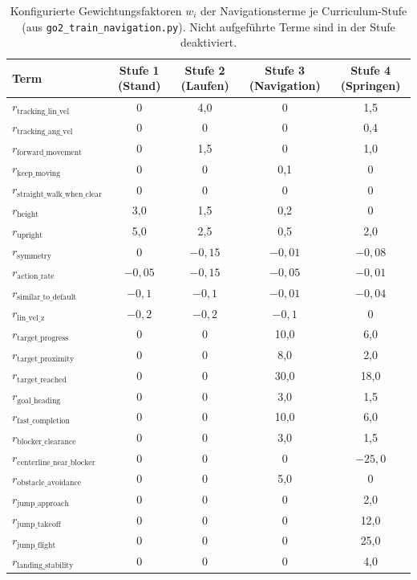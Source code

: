 \begin{table}[htbp]
\centering
\small
\caption{Konfigurierte Gewichtungsfaktoren $w_i$ der Navigationsterme je Curriculum-Stufe (aus \texttt{go2\_train\_navigation.py}). Nicht aufgeführte Terme sind in der Stufe deaktiviert.}
\label{tab:nav_reward_weights}
\begin{tabular}{lcccc}
\hline
Term & Stufe 1 (Stand) & Stufe 2 (Laufen) & Stufe 3 (Navigation) & Stufe 4 (Springen) \\
\hline
$r_{\text{tracking\_lin\_vel}}$ & 0 & 4,0 & 0 & 1,5 \\
$r_{\text{tracking\_ang\_vel}}$ & 0 & 0 & 0 & 0,4 \\
$r_{\text{forward\_movement}}$ & 0 & 1,5 & 0 & 1,0 \\
$r_{\text{keep\_moving}}$ & 0 & 0 & 0,1 & 0 \\
$r_{\text{straight\_walk\_when\_clear}}$ & 0 & 0 & 0 & 0 \\
$r_{\text{height}}$ & 3,0 & 1,5 & 0,2 & 0 \\
$r_{\text{upright}}$ & 5,0 & 2,5 & 0,5 & 2,0 \\
$r_{\text{symmetry}}$ & 0 & $-0{,}15$ & $-0{,}01$ & $-0{,}08$ \\
$r_{\text{action\_rate}}$ & $-0{,}05$ & $-0{,}15$ & $-0{,}05$ & $-0{,}01$ \\
$r_{\text{similar\_to\_default}}$ & $-0{,}1$ & $-0{,}1$ & $-0{,}01$ & $-0{,}04$ \\
$r_{\text{lin\_vel\_z}}$ & $-0{,}2$ & $-0{,}2$ & $-0{,}1$ & 0 \\
$r_{\text{target\_progress}}$ & 0 & 0 & 10,0 & 6,0 \\
$r_{\text{target\_proximity}}$ & 0 & 0 & 8,0 & 2,0 \\
$r_{\text{target\_reached}}$ & 0 & 0 & 30,0 & 18,0 \\
$r_{\text{goal\_heading}}$ & 0 & 0 & 3,0 & 1,5 \\
$r_{\text{fast\_completion}}$ & 0 & 0 & 10,0 & 6,0 \\
$r_{\text{blocker\_clearance}}$ & 0 & 0 & 3,0 & 1,5 \\
$r_{\text{centerline\_near\_blocker}}$ & 0 & 0 & 0 & $-25{,}0$ \\
$r_{\text{obstacle\_avoidance}}$ & 0 & 0 & 5,0 & 0 \\
$r_{\text{jump\_approach}}$ & 0 & 0 & 0 & 2,0 \\
$r_{\text{jump\_takeoff}}$ & 0 & 0 & 0 & 12,0 \\
$r_{\text{jump\_flight}}$ & 0 & 0 & 0 & 25,0 \\
$r_{\text{landing\_stability}}$ & 0 & 0 & 0 & 4,0 \\
\hline
\end{tabular}
\end{table}

